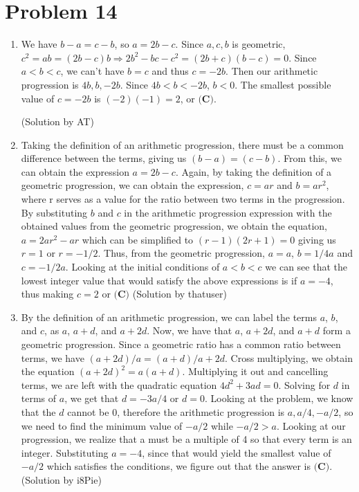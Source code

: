 \documentclass{article}%
\begin{document}
\section*{Problem 14}%
\label{sec:Problem14}%
\begin{enumerate}%
\item%
We have $b-a=c-b$, so $a=2b-c$. Since $a,c,b$ is geometric, $c^2=ab=(2b-c)b \Rightarrow 2b^2-bc-c^2=(2b+c)(b-c)=0$. Since $a<b<c$, we can't have $b=c$ and thus $c=-2b$. Then our arithmetic progression is $4b,b,-2b$. Since $4b < b < -2b$, $b < 0$. The smallest possible value of $c=-2b$ is $(-2)(-1)=2$, or $\boxed{\textbf{(C)}}$.

(Solution by AT)

%
\item%
Taking the definition of an arithmetic progression, there must be a common difference between the terms, giving us $(b-a) = (c-b)$. From this, we can obtain the expression $a = 2b-c$. Again, by taking the definition of a geometric progression, we can obtain the expression, $c=ar$ and $b=ar^2$, where r serves as a value for the ratio between two terms in the progression. By substituting $b$ and $c$ in the arithmetic progression expression with the obtained values from the geometric progression, we obtain the equation, $a=2ar^2-ar$ which can be simplified to $(r-1)(2r+1)=0$ giving us $r=1$ or $r=-1/2$. Thus, from the geometric progression, $a=a$, $b=1/4a$ and $c=-1/2a$. Looking at the initial conditions of $a<b<c$ we can see that the lowest integer value that would satisfy the above expressions is if $a = -4$, thus making $c=2$ or $\boxed{\textbf{(C)}}$ 
(Solution by thatuser)

%
\item%
By the definition of an arithmetic progression, we can label the terms $a$, $b$, and $c$, as $a$, $a+d$, and $a+2d$. Now, we have that $a$, $a+2d$, and $a+d$ form a geometric progression. Since a geometric ratio has a common ratio between terms, we have $(a+2d)/a = (a+d)/a+2d$. Cross multiplying, we obtain the equation $(a+2d)^2=a(a+d)$. Multiplying it out and cancelling terms, we are left with the quadratic equation $4d^2+3ad=0$. Solving for $d$ in terms of $a$, we get that $d=-3a/4$ or $d=0$. Looking at the problem, we know that the $d$ cannot be 0, therefore the arithmetic progression is $a, a/4, -a/2$, so we need to find the minimum value of $-a/2$ while $-a/2>a$. Looking at our progression, we realize that a must be a multiple of 4 so that every term is an integer. Substituting $a=-4$, since that would yield the smallest value of $-a/2$ which satisfies the conditions, we figure out that the answer is $\boxed{\textbf{(C)}}$.
(Solution by i8Pie)

%
\end{enumerate}
\end{document}
